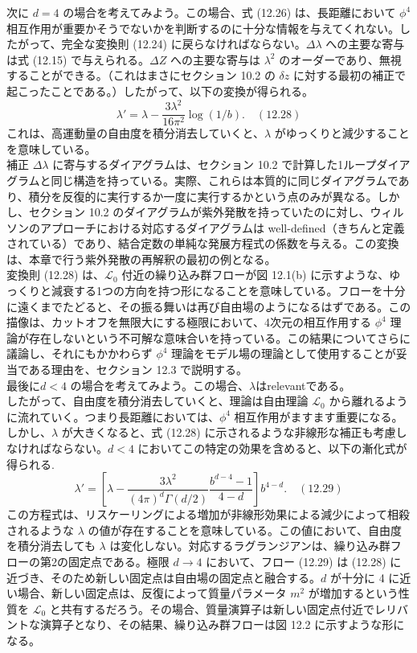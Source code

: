 \documentclass[uplatex,dvipdfmx]{jsarticle}
\begin{document}
次に $d = 4$ の場合を考えてみよう。この場合、式 (12.26) は、長距離において $\phi^4$ 相互作用が重要かそうでないかを判断するのに十分な情報を与えてくれない。したがって、完全な変換則 (12.24) に戻らなければならない。$\Delta\lambda$ への主要な寄与は式 (12.15) で与えられる。$\Delta Z$ への主要な寄与は $\lambda^2$ のオーダーであり、無視することができる。（これはまさにセクション 10.2 の $\delta z$ に対する最初の補正で起こったことである。）したがって、以下の変換が得られる。
\begin{equation}
    \lambda' = \lambda - \frac{3\lambda^2}{16\pi^2} \log(1/b). \quad (12.28)
\end{equation}
これは、高運動量の自由度を積分消去していくと、$\lambda$ がゆっくりと減少することを意味している。\\
補正 $\Delta\lambda$ に寄与するダイアグラムは、セクション 10.2 で計算した1ループダイアグラムと同じ構造を持っている。実際、これらは本質的に同じダイアグラムであり、積分を反復的に実行するか一度に実行するかという点のみが異なる。しかし、セクション 10.2 のダイアグラムが紫外発散を持っていたのに対し、ウィルソンのアプローチにおける対応するダイアグラムは well-defined（きちんと定義されている）であり、結合定数の単純な発展方程式の係数を与える。この変換は、本章で行う紫外発散の再解釈の最初の例となる。\\
変換則 (12.28) は、$\mathcal{L}_0$ 付近の繰り込み群フローが図 12.1(b) に示すような、ゆっくりと減衰する1つの方向を持つ形になることを意味している。フローを十分に遠くまでたどると、その振る舞いは再び自由場のようになるはずである。この描像は、カットオフを無限大にする極限において、4次元の相互作用する $\phi^4$ 理論が存在しないという不可解な意味合いを持っている。この結果についてさらに議論し、それにもかかわらず $\phi^4$ 理論をモデル場の理論として使用することが妥当である理由を、セクション 12.3 で説明する。\\
最後に$d < 4$ の場合を考えてみよう。この場合、$\lambda$はrelevantである。\\
したがって、自由度を積分消去していくと、理論は自由理論 $\mathcal{L}_0$ から離れるように流れていく。つまり長距離においては、$\phi^4$ 相互作用がますます重要になる。しかし、$\lambda$ が大きくなると、式 (12.28) に示されるような非線形な補正も考慮しなければならない。$d < 4$ においてこの特定の効果を含めると、以下の漸化式が得られる.
\begin{equation}
    \lambda' = \left[ \lambda - \frac{3\lambda^2}{(4\pi)^d \Gamma(d/2)} \frac{b^{d-4}-1}{4-d} \right] b^{4-d}. \quad (12.29)
\end{equation}
この方程式は、リスケーリングによる増加が非線形効果による減少によって相殺されるような $\lambda$ の値が存在することを意味している。この値において、自由度を積分消去しても $\lambda$ は変化しない。対応するラグランジアンは、繰り込み群フローの第2の固定点である。極限 $d \rightarrow 4$ において、フロー (12.29) は (12.28) に近づき、そのため新しい固定点は自由場の固定点と融合する。$d$ が十分に 4 に近い場合、新しい固定点は、反復によって質量パラメータ $m^2$ が増加するという性質を $\mathcal{L}_0$ と共有するだろう。その場合、質量演算子は新しい固定点付近でレリバントな演算子となり、その結果、繰り込み群フローは図 12.2 に示すような形になる。
\end{document}
